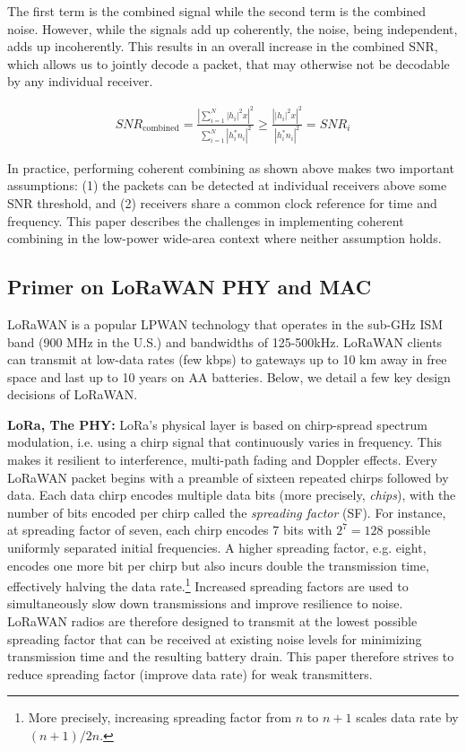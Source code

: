 The first term is the combined signal while the second term is the combined
noise. However, while the signals add up coherently, the noise, being
independent, adds up incoherently. This results in an overall increase in the
combined SNR, which allows us to jointly decode a packet, that may otherwise
not be decodable by any individual receiver.

\compactimg

\begin{align*}
SNR_{\text{combined}} %
	= \frac{\left| \sum_{i=1}^N \left| h_i \right|^2 x \right|^2}{\sum_{i=1}^N \left| h^*_i n_i \right|^2} 
	\geq \frac{\left| \left| h_i \right|^2 x \right|^2}{\left| h^*_i n_i \right|^2} = SNR_i
\end{align*}

In practice, performing coherent combining as shown above makes two important
assumptions: (1) the packets can be detected at individual receivers above
some SNR threshold, and (2) receivers share a common clock reference for time
and frequency. This paper describes the challenges in implementing coherent
combining in the low-power wide-area context where neither assumption holds.


\subsection{Primer on LoRaWAN PHY and MAC}
\label{sec:lora}

LoRaWAN is a popular LPWAN technology that operates in the sub-GHz ISM band
(900 MHz in the U.S.) and bandwidths of 125-500kHz. LoRaWAN clients can
transmit at low-data rates (few kbps) to gateways up to 10 km away in free
space and last up to 10 years on AA batteries. Below, we detail a few key
design decisions of LoRaWAN.

\noindent \textbf{LoRa, The PHY: } LoRa's physical layer is based on
chirp-spread spectrum modulation, i.e. using a chirp signal that continuously
varies in frequency. This makes it resilient to interference, multi-path
fading and Doppler effects. Every LoRaWAN packet begins with a preamble of
sixteen repeated chirps followed by data. Each data chirp encodes multiple
data bits (more precisely, \textit{chips}), with the number of  bits encoded
per chirp called the \textit{spreading factor} (SF). For instance, at
spreading factor of seven, each chirp encodes 7 bits with $2^7 = 128$ possible
uniformly separated initial frequencies. A higher spreading factor, e.g.
eight, encodes one more bit per chirp but also incurs double the transmission
time, effectively halving the data rate.\footnote{More precisely, increasing
spreading factor from $n$ to $n+1$ scales data rate by $(n+1)/2n$.} Increased
spreading factors are used to simultaneously slow down transmissions and
improve resilience to noise. LoRaWAN radios are therefore designed to transmit
at the lowest possible spreading factor that can be received at existing noise
levels for minimizing transmission time and the resulting battery drain. This
paper therefore strives to reduce spreading factor (improve data rate) for
weak transmitters.

